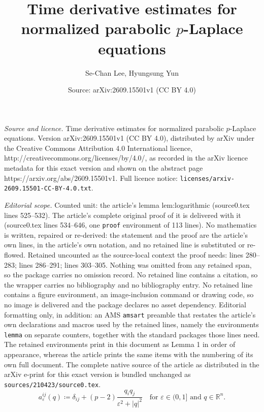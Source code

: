 \documentclass[10pt,a4paper]{amsart}
\title{Time derivative estimates for normalized parabolic $p$-Laplace equations}
\author{Se-Chan Lee, Hyungsung Yun}
\date{Source: arXiv:2609.15501v1 (CC BY 4.0)}
\begin{document}
\maketitle

\noindent\emph{Source and licence.} Time derivative estimates for normalized parabolic $p$-Laplace equations. Version arXiv:2609.15501v1 (CC BY 4.0), distributed by arXiv under the Creative Commons Attribution 4.0 International licence, http://creativecommons.org/licenses/by/4.0/, as recorded in the arXiv licence metadata for this exact version and shown on the abstract page https://arxiv.org/abs/2609.15501v1. Full licence notice: \texttt{licenses/arxiv-2609.15501-CC-BY-4.0.txt}.\par\smallskip

\noindent\textit{Editorial scope.} Counted unit: the article's lemma lem:logarithmic (source0.tex lines 525--532). The article's complete original proof of it is delivered with it (source0.tex lines 534--646, one \texttt{proof} environment of 113 lines). No mathematics is written, repaired or re-derived: the statement and the proof are the article's own lines, in the article's own notation, and no retained line is substituted or re-flowed.  Retained uncounted as the source-local context the proof needs: lines 280--283; lines 286--291; lines 303--305.  Nothing was omitted from any retained span, so the package carries no omission record.  No retained line contains a citation, so the wrapper carries no bibliography and no bibliography entry.  No retained line contains a figure environment, an image-inclusion command or drawing code, so no image is delivered and the package declares no asset dependency.  Editorial formatting only, in addition: an AMS \texttt{amsart} preamble that restates the article's own declarations and macros used by the retained lines, namely the environments \texttt{lemma} on separate counters, together with the standard packages those lines need.  The retained environments print in this document as Lemma 1 in order of appearance, whereas the article prints the same items with the numbering of its own full document.  The complete native source of the article as distributed in the arXiv e-print for this exact version is bundled unchanged as \texttt{sources/210423/source0.tex}.
\begin{equation}\label{eq:matrix}
 a^{ij}_\varepsilon(q)\coloneqq \delta_{ij}+(p-2)\frac{q_iq_j}{\varepsilon^2+|q|^2}
 \quad \text{for $\varepsilon \in (0, 1]$ and $q \in \mathbb{R}^n$}.
\end{equation}
\end{document}
